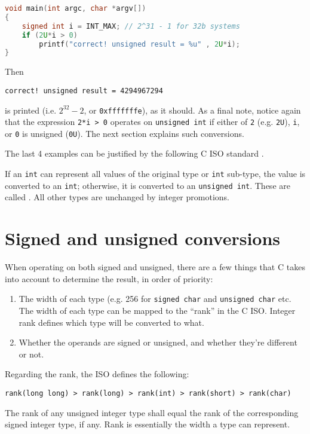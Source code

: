 \begin{exmp}
\begin{exmp}
\begin{lstlisting}[language=c]
void main(int argc, char *argv[])
{
	signed int i = INT_MAX; // 2^31 - 1 for 32b systems
	if (2U*i > 0)
		printf("correct! unsigned result = %u" , 2U*i);
}
\end{lstlisting}
\end{exmp}
Then
\begin{verbatim}
correct! unsigned result = 4294967294   
\end{verbatim}
is printed (i.e. $2^{32}-2$, or \texttt{0xfffffffe}), as it should. As a final note, notice again that the expression \texttt{2*i > 0} operates on \texttt{unsigned int} if either of \texttt{2} (e.g. \texttt{2U}), \texttt{i}, or \texttt{0} is unsigned (\texttt{0U}). The next section explains such conversions.\qedblack
\end{exmp}
The last 4 examples can be justified by the following C ISO standard \cite{ciso2007}.
\begin{takeaway}
If an \textup{\texttt{int}} can represent all values of the original type or \textup{\texttt{int}} sub-type, the value is converted to an \textup{\texttt{int}}; otherwise, it is converted to an \textup{\texttt{unsigned int}}. These are called . All other types are unchanged by integer promotions. 
\end{takeaway}




\section{Signed and unsigned conversions}


When operating on both signed and unsigned, there are a few things that C takes into account to determine the result, in order of priority:
\begin{enumerate}
    \item The width of each type (e.g. 256 for \texttt{signed char} and \texttt{unsigned char} etc. The width of each type can be mapped to the ``rank'' in the C ISO. Integer rank defines which type will be converted to what.
    \item Whether the operands are signed or unsigned, and whether they're different or not.
\end{enumerate}
Regarding the rank, the ISO\cite{ciso2007} defines the following:
\begin{takeaway}
\begin{lstlisting}
rank(long long) > rank(long) > rank(int) > rank(short) > rank(char)
\end{lstlisting}
The rank of any unsigned integer type shall equal the rank of the corresponding
signed integer type, if any. Rank is essentially the width a type can represent.
\end{takeaway}

